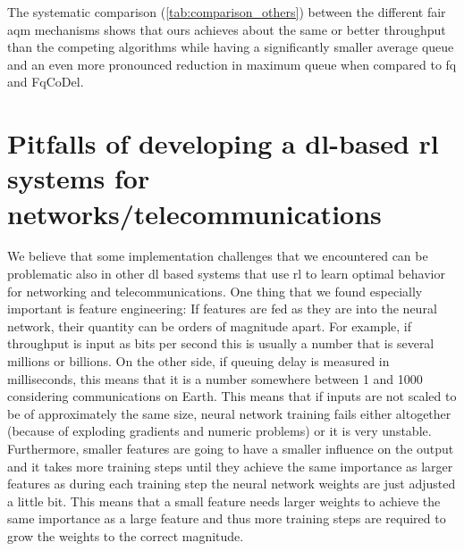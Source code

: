 \documentclass[conference]{IEEEtran}
\begin{document}
The systematic comparison (\autoref{tab:comparison_others}) between the different fair \gls{aqm} mechanisms shows that \gls{ours} achieves about the same or better throughput than the competing algorithms while having a significantly smaller average queue and an even more pronounced reduction in maximum queue when compared to fq and FqCoDel.  

\section{Pitfalls of developing a \gls{dl}-based \gls{rl} systems for networks/telecommunications}

We believe that some implementation challenges that we encountered can be problematic also in other \gls{dl} based systems that use \gls{rl} to learn optimal behavior for networking and telecommunications. One thing that we found especially important is feature engineering: If features are fed as they are into the neural network, their quantity can be orders of magnitude apart. For example, if throughput is input as bits per second this is usually a number that is several millions or billions. On the other side, if queuing delay is measured in milliseconds, this means that it is a number somewhere between 1 and 1000 considering communications on Earth. This means that if inputs are not scaled to be of approximately the same size, neural network training fails either altogether (because of exploding gradients and numeric problems) or it is very unstable. Furthermore, smaller features are going to have a smaller influence on the output and it takes more training steps until they achieve the same importance as larger features as during each training step the neural network weights are just adjusted a little bit. This means that a small feature needs larger weights to achieve the same importance as a large feature and thus more training steps are required to grow the weights to the correct magnitude. 
\end{document}
